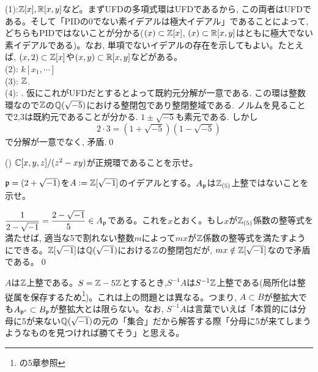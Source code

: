 \begin{egans}
(1):$\mathbb{Z}[x], \mathbb{R}[x,y]$など。まずUFDの多項式環はUFDであるから, この両者はUFDである。そして「PIDの0でない素イデアルは極大イデアル」であることによって, どちらもPIDではないことが分かる($(x) \subset \mathbb{Z}[x]$, $(x)\subset \mathbb{R}[x,y]$はともに極大でない素イデアルである)。なお, 単項でないイデアルの存在を示してもよい。たとえば, $(x,2)\subset \mathbb{Z}[x]$や$(x,y) \subset \mathbb{R}[x,y]$などがある。\\
(2): $k[x_1,\cdots]$\\
(3): $\mathbb{Z}$. \\
(4): . 仮にこれがUFDだとするとよって既約元分解が一意である.  この環は整数環なので$\mathbb{Z}$の$\mathbb{Q}(\sqrt{-5})$における整閉包であり整閉整域である. ノルムを見ることで2,3は既約元であることが分かる. $1\pm \sqrt{-5}$も素元である. しかし
\[2\cdot 3 = (1+\sqrt{-5})(1-\sqrt{-5})\]
で分解が一意でなく, 矛盾.\qed

\end{egans}





\begin{egprob} (\cite{aoyukie})
$\mathbb{C}[x,y,z]/(z^2 - xy)$が正規環であることを示せ。
\end{egprob}
\begin{egans}
\end{egans}





\begin{egprob}
$\mathfrak{p} = (2+\sqrt{-1})$を$A:=\mathbb{Z}[\sqrt{-1}]$のイデアルとする。$A_{\mathfrak{p}}$は$\mathbb{Z}_{(5)}$上整ではないことを示せ。
\end{egprob}
\begin{egans}
$\dfrac{1}{2-\sqrt{-1}} = \dfrac{2-\sqrt{-1}}{5}\in A_{\mathfrak{p}}$である。これを$x$とおく。もし$x$が$\mathbb{Z}_{(5)}$係数の整等式を満たせば, 適当な5で割れない整数$m$によって$mx$が$\mathbb{Z}$係数の整等式を満たすようにできる。$\mathbb{Z}[\sqrt{-1}]$は$\mathbb{Q}(\sqrt{-1})$における$\mathbb{Z}$の整閉包だが, $mx\notin \mathbb{Z}[\sqrt{-1}]$なので矛盾である。\qed
\end{egans}
\begin{rem}
$A$は$\mathbb{Z}$上整である。$S=\mathbb{Z}-5\mathbb{Z}$とするとき,$S^{-1}A$は$S^{-1}\mathbb{Z}$上整である(局所化は整従属を保存するため\footnote{\cite{atiyah}の5章参照})。これは上の問題とは異なる。つまり, $A\subset B$が整拡大でも$A_{\mathfrak{p}^{c}} \subset B_{\mathfrak{p}}$が整拡大とは限らない。なお, $S^{-1}A$は言葉でいえば「本質的には分母に5が来ない$\mathbb{Q}(\sqrt{-1})$の元の「集合」だから解答する際「分母に5が来てしまうようなものを見つければ勝てそう」と思える。
\end{rem}


